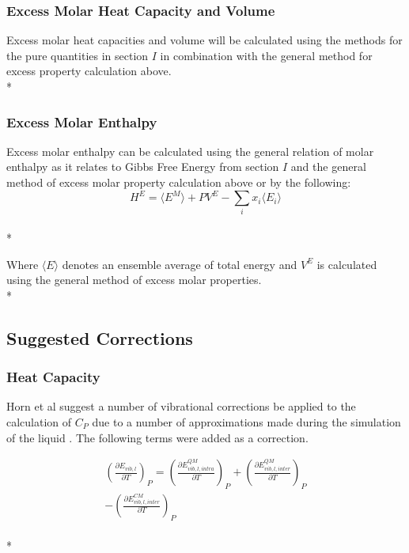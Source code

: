 \documentclass[aps,pre,twocolumn,nofootinbib,superscriptaddress,linenumbers,10pt, draft,tightenlines]{revtex4-1}
\begin{document}
\subsubsection{Excess Molar Heat Capacity and Volume}
Excess molar heat capacities and volume will be calculated using the  methods for the pure quantities in section $I$ in combination with the general method for excess property calculation above.\\*


\subsubsection{Excess Molar Enthalpy}
Excess molar enthalpy can be calculated using the general relation of molar enthalpy as it relates to Gibbs Free Energy from section $I$ and the general method of excess molar property calculation above or by the following\cite{hexcess}:
\begin{equation}H^E = \langle E^M \rangle + P V^E - \sum_{i} x_i \langle E_i \rangle\end{equation}\\*
 
Where $\langle E \rangle$ denotes an ensemble average of total energy and $V^E$ is calculated using the general method of excess molar properties.\\* 


\subsection{Suggested Corrections}
\subsubsection{Heat Capacity}
Horn et al suggest a number of vibrational corrections be applied to the calculation of $C_P$ due to a number of approximations made during the simulation of the liquid \cite{horn}. The following terms were added as a correction.

\begin{multline}
\left(\frac{\partial E_{vib,l}}{\partial T}\right)_{P} = \left(\frac{\partial E_{vib,l,intra}^{QM}}{\partial T}\right)_{P} + \left(\frac{\partial E_{vib,l,inter}^{QM}}{\partial T}\right)_{P} \\ - \left(\frac{\partial E_{vib,l,inter}^{CM}}{\partial T}\right)_{P}
\end{multline}\\*
\end{document}
